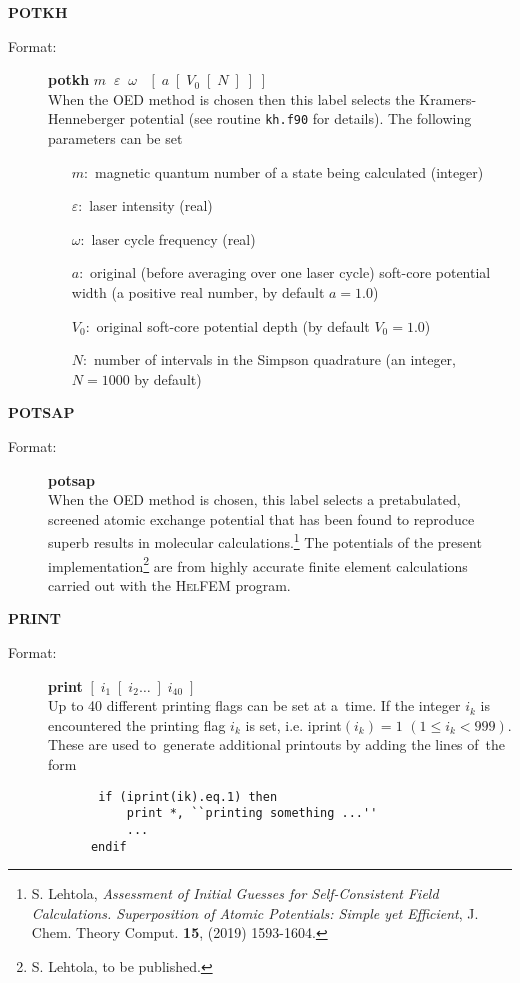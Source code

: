 \documentclass[12pt,a4paper]{article}
\newcommand{\ft}[1]{\texttt{#1}}
\begin{document}
\begin{description}
\item \textbf{POTKH}
\begin{description}
\item[Format:] \textbf{potkh}
  $m\;\;\varepsilon\;\;\omega\;\;\;[\;a\;[\;V_0\;[\;N\;]\;]\;]$
  \\ When the OED method is chosen then this label selects the
  Kramers-Henneberger potential (see routine \ft{kh.f90} for
  details). The following parameters can be set
\begin{itemize}
\item [$m:$] magnetic quantum number of a state being calculated (integer)
\item [$\varepsilon:$] laser intensity (real)
\item [$\omega:$] laser cycle frequency (real)
\item [$a:$] original (before averaging over one laser cycle)
  soft-core potential width (a positive real number, by default $a=1.0$)
\item [$V_0:$] original soft-core potential depth (by default $V_0=1.0$)
\item [$N:$] number of intervals in the Simpson quadrature (an
  integer, $N=1000$ by default)
\end{itemize}
\end{description}

\item \textbf{POTSAP}
\begin{description}
\item[Format:] \textbf{potsap} \\ When the OED method is chosen, this
  label selects a pretabulated, screened atomic exchange potential
  that has been found to reproduce superb results in molecular
  calculations.\footnote{S. Lehtola, \textsl{Assessment of Initial
      Guesses for Self-Consistent Field Calculations. Superposition of
      Atomic Potentials: Simple yet Efficient}, J. Chem. Theory
    Comput. \textbf{15}, (2019)
    1593-1604. } The potentials of the
  present implementation\footnote{S. Lehtola, to be published.} are
  from highly accurate finite element calculations carried out with
  the \textsc{HelFEM} program.
\end{description}

\item \textbf{PRINT}
\begin{description}
\item[Format:] \textbf{print} $[\; i_1 \; [\;i_2 \ldots \;] \;i_{40}\;]$ \\ Up to 40
  different printing flags can be set at a~time. If the integer $i_k$ is encountered the
  printing flag $i_k$ is set, i.e. iprint$(i_k)=1$ $(1 \leq i_k<999)$. These are used
  to~generate additional printouts by adding the lines of~the form
  \begin{verbatim}
       if (iprint(ik).eq.1) then
           print *, ``printing something ...''
           ...
      endif
    \end{verbatim}


\end{description}
\end{description}
\end{document}
